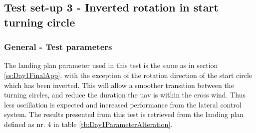\subsection{Test set-up 3 - Inverted rotation in start turning circle}\label{ss:Day1Inverted}
\subsubsection{General - Test parameters}
The landing plan parameter used in this test is the same as in section \ref{ss:Day1FinalApp}, with the exception of the rotation direction of the start circle which has been inverted. This will allow a smoother transition between the turning circles, and reduce the duration the \gls{uav} is within the cross wind. Thus less oscillation is expected and increased performance from the lateral control system.
The results presented from this test is retrieved from the landing plan defined as nr. 4 in table \ref{tb:Day1ParameterAlteration}.
